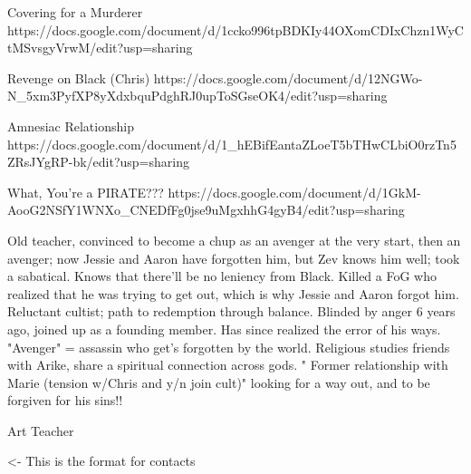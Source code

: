 \documentclass[char]{GL2020}
\begin{document}
Covering for a Murderer https://docs.google.com/document/d/1ccko996tpBDKIy44OXomCDIxChzn1WyCtMSvsgyVrwM/edit?usp=sharing

Revenge on Black (Chris)  https://docs.google.com/document/d/12NGWo-N_5xm3PyfXP8yXdxbquPdghRJ0upToSGseOK4/edit?usp=sharing

Amnesiac Relationship https://docs.google.com/document/d/1_hEBifEantaZLoeT5bTHwCLbiO0rzTn5ZRsJYgRP-bk/edit?usp=sharing

What, You're a PIRATE??? https://docs.google.com/document/d/1GkM-AooG2NSfY1WNXo_CNEDfFg0jse9uMgxhhG4gyB4/edit?usp=sharing  

Old teacher, convinced to become a chup as an avenger at the very start, then an avenger; now Jessie and Aaron have forgotten him, but Zev knows him well; took a sabatical. Knows that there'll be no leniency from Black. Killed a FoG who realized that he was trying to get out, which is why Jessie and Aaron forgot him.	Reluctant cultist; path to redemption through balance. Blinded by anger 6 years ago, joined up as a founding member. Has since realized the error of his ways. "Avenger" = assassin who get's forgotten by the world. Religious studies friends with Arike, share a spiritual connection across gods.	"
Former relationship with Marie (tension w/Chris and y/n join cult)"	looking for a way out, and to be forgiven for his sins!!

Art Teacher

\begin{itemz}[Goals]
	\item 
\end{itemz}

\begin{itemz}[Notes]
	\item 
\end{itemz}

\begin{contacts}
	\contact{\cTest{}} <- This is the format for contacts 
\end{contacts}
\end{document}
